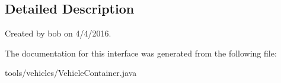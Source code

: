 \subsection{Detailed Description}
Created by bob on 4/4/2016. 

The documentation for this interface was generated from the following file\+:\begin{DoxyCompactItemize}
\item 
tools/vehicles/Vehicle\+Container.\+java\end{DoxyCompactItemize}

